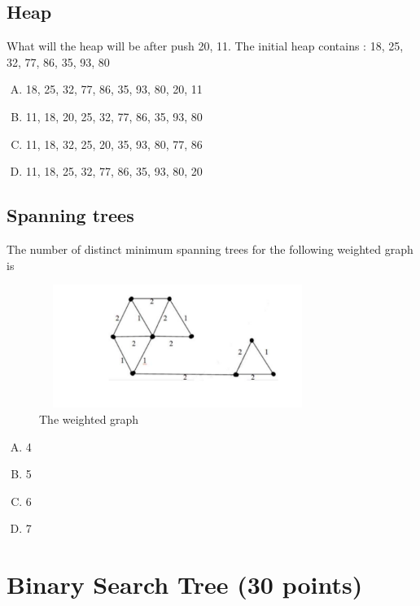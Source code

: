 \documentclass[11pt]{exam}
\begin{document}
\begin{solution}
\end{solution}

\subsection{Heap}
What will the heap will be after push 20, 11. The initial heap contains : {18, 25, 32, 77, 86, 35, 93, 80}
\begin{enumerate}[A)]
    \item {18, 25, 32, 77, 86, 35, 93, 80, 20, 11}
    \item {11, 18, 20, 25, 32, 77, 86, 35, 93, 80}
    \item {11, 18, 32, 25, 20, 35, 93, 80, 77, 86} 
    \item {11, 18, 25, 32, 77, 86, 35, 93, 80, 20}
\end{enumerate}
\begin{solution}
\end{solution}

\subsection{Spanning trees}

The number of distinct minimum spanning trees for the following weighted graph is 
\begin{figure}[htbp]
    \centering
    \includegraphics[height=40mm,width=90mm]{span.png}
    \caption{The weighted graph}
\end{figure}   
\begin{enumerate}[A)]
    \item 4
    \item 5
    \item 6
    \item 7
\end{enumerate}
\begin{solution}
\end{solution}

\section{Binary Search Tree (30 points)}
\end{document}
